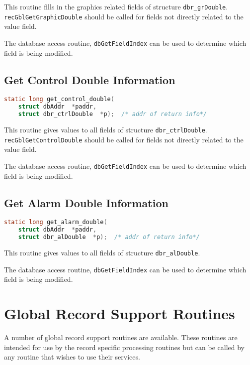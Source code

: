 This routine fills in the graphics related fields of structure \verb|dbr_grDouble|.
\verb|recGblGetGraphicDouble| should be called for fields not directly related to the value field.

The database access routine, \verb|dbGetFieldIndex| can be used to determine which field is being modified.

\subsection{Get Control Double Information}

\begin{lstlisting}[language=C]
static long get_control_double(
    struct dbAddr  *paddr,
    struct dbr_ctrlDouble  *p);  /* addr of return info*/
\end{lstlisting}

This routine gives values to all fields of structure \verb|dbr_ctrlDouble|.
\verb|recGblGetControlDouble| should be called for fields not directly related to the value field.

The database access routine, \verb|dbGetFieldIndex| can be used to determine which field is being modified.

\subsection{Get Alarm Double Information}

\begin{lstlisting}[language=C]
static long get_alarm_double(
    struct dbAddr  *paddr,
    struct dbr_alDouble  *p);  /* addr of return info*/
\end{lstlisting}

This routine gives values to all fields of structure \verb|dbr_alDouble|.

The database access routine, \verb|dbGetFieldIndex| can be used to determine which field is being modified.

\section{Global Record Support Routines}

A number of global record support routines are available.
These routines are intended for use by the record specific processing routines but can be called by any routine that wishes to use their services.

